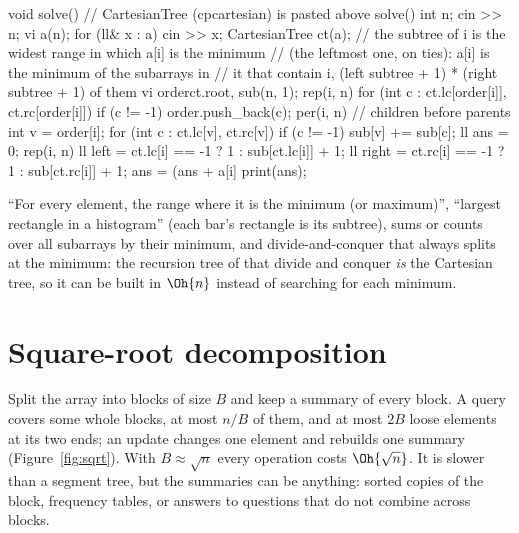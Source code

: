 \begin{code}
void solve() {  // CartesianTree (cpcartesian) is pasted above solve()
    int n;
    cin >> n;
    vi a(n);
    for (ll& x : a) cin >> x;
    CartesianTree ct(a);
    // the subtree of i is the widest range in which a[i] is the minimum
    // (the leftmost one, on ties): a[i] is the minimum of the subarrays in
    // it that contain i, (left subtree + 1) * (right subtree + 1) of them
    vi order{ct.root}, sub(n, 1);
    rep(i, n) for (int c : {ct.lc[order[i]], ct.rc[order[i]]})
        if (c != -1) order.push_back(c);
    per(i, n) {  // children before parents
        int v = order[i];
        for (int c : {ct.lc[v], ct.rc[v]})
            if (c != -1) sub[v] += sub[c];
    }
    ll ans = 0;
    rep(i, n) {
        ll left = ct.lc[i] == -1 ? 1 : sub[ct.lc[i]] + 1;
        ll right = ct.rc[i] == -1 ? 1 : sub[ct.rc[i]] + 1;
        ans = (ans + a[i] %
    }
    print(ans);
}
\end{code}


\begin{recognize}
``For every element, the range where it is the minimum (or maximum)'', ``largest rectangle in a histogram'' (each bar's rectangle is
its subtree), sums or counts over all subarrays by their minimum, and divide-and-conquer that always splits at the minimum: the
recursion tree of that divide and conquer \emph{is} the Cartesian tree, so it can be built in $\Oh{n}$ instead of searching for each
minimum.
\end{recognize}

\section[Square-root decomposition]{Square-root decomposition \hfill \plat}\label{sec:sqrt}

Split the array into blocks of size $B$ and keep a summary of every block. A query covers some whole blocks, at most $n / B$ of them,
and at most $2B$ loose elements at its two ends; an update changes one element and rebuilds one summary (Figure~\ref{fig:sqrt}). With
$B \approx \sqrt n$ every operation costs $\Oh{\sqrt n}$. It is slower than a segment tree, but the summaries can be anything:
sorted copies of the block, frequency tables, or answers to questions that do not combine across blocks.


